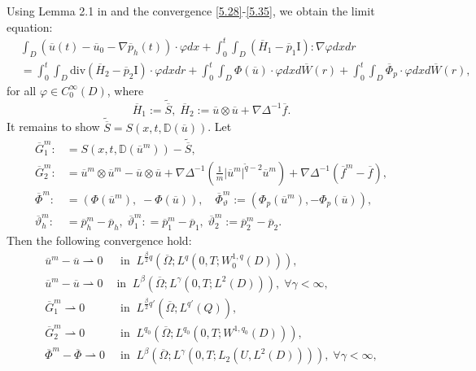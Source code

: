 \documentclass[reqno]{amsart}
\theoremstyle{definition}
\theoremstyle{remark}
\numberwithin{equation}{section} \allowdisplaybreaks
\begin{document}
Using  Lemma 2.1 in \cite{ADNGRT} and the convergence
\eqref{5.28}-\eqref{5.35}, we obtain the limit equation:
\begin{equation}\label{5.36}
\begin{split}
&\int_{D}(\overline{u}(t)-\overline{u}_0-\nabla \overline{p}_h(t))\cdot\varphi dx+\int_0^t\!\!\!\int_{D}(\overline{H}_1-\overline{p}_1\text{I}):\nabla\varphi dxdr\\
&=\int_0^t\!\!\!\int_{D}\text{div}(\overline{H}_2-\overline{p}_2\textrm{I})\cdot\varphi
dxdr+\int_0^t\!\!\!\int_{D}\Phi(\overline{u})\cdot\varphi
dxd\overline{W}(r)+\int_0^t\!\!\!\int_{D}\overline{\Phi}_p\cdot\varphi
dxd\overline{W}(r),
\end{split}
\end{equation}
for all $\varphi\in C_0^\infty(D)$, where
$$\overline{H}_1:=\tilde{\overline{S}},\; \overline{H}_2:=\overline{u}\otimes\overline{u}+\nabla\Delta^{-1}\overline{f}.$$
It remains to show
$\tilde{\overline{S}}=S(x,t,\mathbb{D}(\overline{u}))$. Let
\begin{align*}
\overline{G}_1^m:&=S(x,t,\mathbb{D}(\overline{u}^m))-\tilde{\overline{S}},\\
\overline{G}_2^m:&=\overline{u}^m\otimes\overline{u}^m-\overline{u}\otimes\overline{u}+
\nabla\Delta^{-1}\left(\frac{1}{m}|\overline{u}^m|^{\tilde{q}-2}\overline{u}^m\right)+\nabla\Delta^{-1}(\overline{f}^m-\overline{f}),\\
\overline{\Phi}^m:&=(\Phi(\overline{u}^m),\;-\Phi(\overline{u})), \quad \overline{\Phi}_\vartheta^m:=(\Phi_p(\overline{u}^m),-\Phi_p(\overline{u})),\\
\overline{\vartheta}_h^m:&=\overline{p}_h^m-\overline{p}_h,\;\overline{\vartheta}_1^m:
=\overline{p}_1^m-\overline{p}_1,\;\overline{\vartheta}_2^m:=\overline{p}_2^m-\overline{p}_2.
\end{align*}
Then the following convergence hold:
\begin{align}\label{5.39}
\overline{u}^m-\overline{u}\rightharpoonup 0& ~\mbox{ in }~
L^{\frac{\beta}{2}q} (\overline{\Omega};L^q(0,T;W_{0}^{1,q}(D))),\\
\label{5.40} \overline{u}^m-\overline{u}\rightharpoonup 0& ~\mbox{
in }~
L^{\beta}(\overline{\Omega};L^{\gamma}(0,T;L^2(D))),\; \forall \gamma<\infty,\\
\label{5.41} \overline{G}_1^m\rightharpoonup 0 &~\mbox{ in }~
L^{\frac{\beta}{2}q'}(\overline{\Omega};L^{q'}(Q)),\\
\label{5.42} \overline{G}_2^m\rightharpoonup 0& ~\mbox{ in }~
L^{q_0}
(\overline{\Omega};L^{q_0}(0,T;W^{1,q_0}(D))),\\
\label{5.43} \overline{\Phi}^m-\overline{\Phi}\rightharpoonup 0&
~\mbox{ in }~
L^{\beta}(\overline{\Omega};L^{\gamma}(0,T;L_2({U},L^2(D)))),\;
\forall \gamma<\infty,
\end{align}
\end{document}

